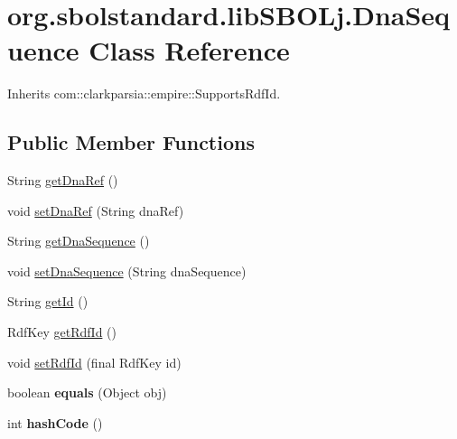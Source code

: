 \hypertarget{classorg_1_1sbolstandard_1_1lib_s_b_o_lj_1_1_dna_sequence}{
\section{org.sbolstandard.libSBOLj.DnaSequence Class Reference}
\label{classorg_1_1sbolstandard_1_1lib_s_b_o_lj_1_1_dna_sequence}
}


Inherits com::clarkparsia::empire::SupportsRdfId.

\subsection*{Public Member Functions}
\begin{DoxyCompactItemize}
\item 
String \hyperlink{classorg_1_1sbolstandard_1_1lib_s_b_o_lj_1_1_dna_sequence_ab525992d4a00fe98e4e039133eb452d0}{getDnaRef} ()
\item 
void \hyperlink{classorg_1_1sbolstandard_1_1lib_s_b_o_lj_1_1_dna_sequence_a26f6b6be5be655740acd08158f7de7a6}{setDnaRef} (String dnaRef)
\item 
String \hyperlink{classorg_1_1sbolstandard_1_1lib_s_b_o_lj_1_1_dna_sequence_acda4062f1d8040747df569d99b672270}{getDnaSequence} ()
\item 
void \hyperlink{classorg_1_1sbolstandard_1_1lib_s_b_o_lj_1_1_dna_sequence_a3da557b5c417882926768fab89891e16}{setDnaSequence} (String dnaSequence)
\item 
String \hyperlink{classorg_1_1sbolstandard_1_1lib_s_b_o_lj_1_1_dna_sequence_a48539a5f3bd987989f8f49ea9687d2cc}{getId} ()
\item 
RdfKey \hyperlink{classorg_1_1sbolstandard_1_1lib_s_b_o_lj_1_1_dna_sequence_aed64ecd5e0d01b67901f2fc0fd28dd90}{getRdfId} ()
\item 
void \hyperlink{classorg_1_1sbolstandard_1_1lib_s_b_o_lj_1_1_dna_sequence_a4c87a5e39f780ec94fd91a31d9374394}{setRdfId} (final RdfKey id)
\item 
\hypertarget{classorg_1_1sbolstandard_1_1lib_s_b_o_lj_1_1_dna_sequence_a212bd5dc05cbb2ea8f08d316921141b0}{
boolean {\bfseries equals} (Object obj)}
\label{classorg_1_1sbolstandard_1_1lib_s_b_o_lj_1_1_dna_sequence_a212bd5dc05cbb2ea8f08d316921141b0}

\item 
\hypertarget{classorg_1_1sbolstandard_1_1lib_s_b_o_lj_1_1_dna_sequence_a9a8f03a493f263cba260f786f684ce33}{
int {\bfseries hashCode} ()}
\label{classorg_1_1sbolstandard_1_1lib_s_b_o_lj_1_1_dna_sequence_a9a8f03a493f263cba260f786f684ce33}

\end{DoxyCompactItemize}



